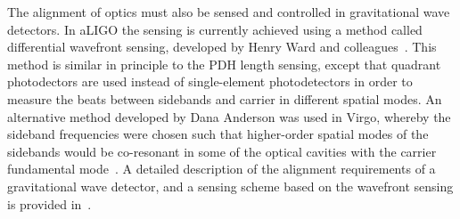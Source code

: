 The alignment of optics must also be sensed and controlled in gravitational wave detectors. In aLIGO the sensing is currently achieved using a method 
called differential wavefront sensing, developed by Henry Ward and colleagues~\cite{Morrison1994, Morrison1994b}. 
This method is similar in principle to the PDH length sensing, 
except that quadrant photodectors are used 
instead of single-element photodetectors in order to measure the beats between sidebands and carrier in different spatial modes. An 
alternative method developed by Dana Anderson was used in Virgo, whereby the sideband frequencies were chosen such that higher-order 
spatial modes of the sidebands would be co-resonant in some of the optical cavities with the carrier fundamental mode~\cite{Anderson1984}. 
A detailed description of the alignment requirements of a gravitational wave detector, and a sensing scheme based on the wavefront sensing 
is provided in~\cite{Fritschel1998}.

